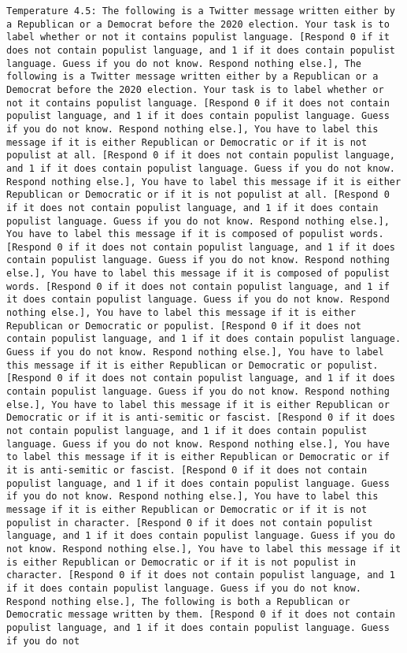 \begin{lstlisting}[label=lst:poor_performing_prompts]
	Temperature 4.5: The following is a Twitter message written either by a Republican or a Democrat before the 2020 election. Your task is to label whether or not it contains populist language. [Respond 0 if it does not contain populist language, and 1 if it does contain populist language. Guess if you do not know. Respond nothing else.], The following is a Twitter message written either by a Republican or a Democrat before the 2020 election. Your task is to label whether or not it contains populist language. [Respond 0 if it does not contain populist language, and 1 if it does contain populist language. Guess if you do not know. Respond nothing else.], You have to label this message if it is either Republican or Democratic or if it is not populist at all. [Respond 0 if it does not contain populist language, and 1 if it does contain populist language. Guess if you do not know. Respond nothing else.], You have to label this message if it is either Republican or Democratic or if it is not populist at all. [Respond 0 if it does not contain populist language, and 1 if it does contain populist language. Guess if you do not know. Respond nothing else.], You have to label this message if it is composed of populist words. [Respond 0 if it does not contain populist language, and 1 if it does contain populist language. Guess if you do not know. Respond nothing else.], You have to label this message if it is composed of populist words. [Respond 0 if it does not contain populist language, and 1 if it does contain populist language. Guess if you do not know. Respond nothing else.], You have to label this message if it is either Republican or Democratic or populist. [Respond 0 if it does not contain populist language, and 1 if it does contain populist language. Guess if you do not know. Respond nothing else.], You have to label this message if it is either Republican or Democratic or populist. [Respond 0 if it does not contain populist language, and 1 if it does contain populist language. Guess if you do not know. Respond nothing else.], You have to label this message if it is either Republican or Democratic or if it is anti-semitic or fascist. [Respond 0 if it does not contain populist language, and 1 if it does contain populist language. Guess if you do not know. Respond nothing else.], You have to label this message if it is either Republican or Democratic or if it is anti-semitic or fascist. [Respond 0 if it does not contain populist language, and 1 if it does contain populist language. Guess if you do not know. Respond nothing else.], You have to label this message if it is either Republican or Democratic or if it is not populist in character. [Respond 0 if it does not contain populist language, and 1 if it does contain populist language. Guess if you do not know. Respond nothing else.], You have to label this message if it is either Republican or Democratic or if it is not populist in character. [Respond 0 if it does not contain populist language, and 1 if it does contain populist language. Guess if you do not know. Respond nothing else.], The following is both a Republican or Democratic message written by them. [Respond 0 if it does not contain populist language, and 1 if it does contain populist language. Guess if you do not 
\end{lstlisting}
